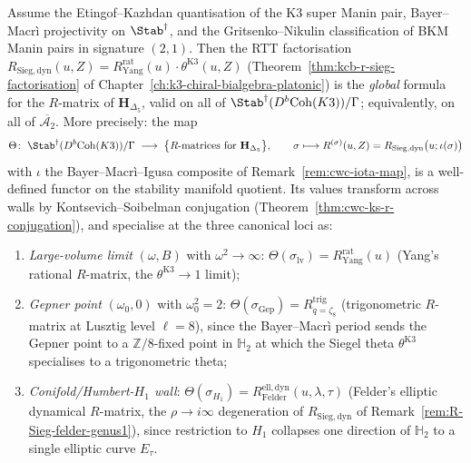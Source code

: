 \begin{theorem}
\label{thm:cwc-global-dictionary}
Assume the Etingof--Kazhdan quantisation of the K3 super Manin pair,
Bayer--Macr\`i projectivity on $\Stab^\dagger$, and the
Gritsenko--Nikulin classification of BKM Manin pairs in signature
$(2,1)$. Then the RTT factorisation
$R_{\mathrm{Sieg,dyn}}(u,Z)=R^{\mathrm{rat}}_{\mathrm{Yang}}(u)\cdot
\theta^{\mathrm{K3}}(u,Z)$ (Theorem~\ref{thm:kcb-r-sieg-factorisation}
of Chapter~\ref{ch:k3-chiral-bialgebra-platonic}) is the \emph{global}
formula for the $R$-matrix of $\mathbf{H}_{\Delta_5}$, valid on all of
$\Stab^\dagger(D^b\mathrm{Coh}(K3))/\Gamma$; equivalently, on all of
$\overline{\mathcal{A}_2}$. More precisely: the map
\[
 \Theta\colon\;
 \Stab^\dagger(D^b\mathrm{Coh}(K3))/\Gamma
 \;\longrightarrow\;
 \bigl\{\text{$R$-matrices for }\mathbf{H}_{\Delta_5}\bigr\},
 \qquad
 \sigma\longmapsto R^{(\sigma)}(u,Z)
 =R_{\mathrm{Sieg,dyn}}\bigl(u;\iota(\sigma)\bigr)
\]
with $\iota$ the Bayer--Macr\`i--Igusa composite of
Remark~\ref{rem:cwc-iota-map}, is a well-defined functor on the
stability manifold quotient. Its values transform across walls by
Kontsevich--Soibelman conjugation
(Theorem~\ref{thm:cwc-ks-r-conjugation}), and specialise at the
three canonical loci as:
\begin{enumerate}[label=\textup{(\roman*)}]
\item \emph{Large-volume limit} $(\omega,B)$ with $\omega^2\to\infty$:
$\Theta(\sigma_{\mathrm{lv}})=R^{\mathrm{rat}}_{\mathrm{Yang}}(u)$
(Yang's rational $R$-matrix, the $\theta^{\mathrm{K3}}\to 1$ limit);
\item \emph{Gepner point} $(\omega_0,0)$ with $\omega_0^2=2$:
$\Theta(\sigma_{\mathrm{Gep}})=R^{\mathrm{trig}}_{q=\zeta_8}$
(trigonometric $R$-matrix at Lusztig level $\ell=8$), since the
Bayer--Macr\`i period sends the Gepner point to a $\mathbb{Z}/8$-fixed
point in $\mathbb{H}_2$ at which the Siegel theta $\theta^{\mathrm{K3}}$
specialises to a trigonometric theta;
\item \emph{Conifold/Humbert-$H_1$ wall}:
$\Theta(\sigma_{H_1})=R^{\mathrm{ell,dyn}}_{\mathrm{Felder}}(u,\lambda,\tau)$
(Felder's elliptic dynamical $R$-matrix, the $\rho\to i\infty$
degeneration of $R_{\mathrm{Sieg,dyn}}$ of
Remark~\ref{rem:R-Sieg-felder-genus1}), since restriction to $H_1$
collapses one direction of $\mathbb{H}_2$ to a single elliptic curve
$E_\tau$.
\end{enumerate}
\end{theorem}

